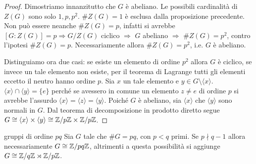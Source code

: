 \begin{proof}
    Dimostriamo innanzitutto che $G$ è abeliano. Le possibili cardinalità di $Z(G)$ sono solo $1, p, p^2$. $\#Z(G) = 1$ è esclusa dalla proposizione precedente. Non può essere neanche $\#Z(G) = p$, infatti si avrebbe $[G : Z(G)] = p \Rightarrow G/Z(G)$ ciclico $\Rightarrow$ $G$ abeliano $\Rightarrow$ $\#Z(G) = p^2$, contro l'ipotesi $\#Z(G) = p$. Necessariamente allora $\#Z(G) = p^2$, i.e. $G$ è abeliano.
    
    Distinguiamo ora due casi: se esiste un elemento di ordine $p^2$ allora $G$ è ciclico, se invece un tale elemento non esiste, per il teorema di Lagrange tutti gli elementi eccetto il neutro hanno ordine $p$. Sia $x$ un tale elemento e $y \in G \setminus \langle x \rangle$. $\langle x \rangle\cap \langle y \rangle = \{e\}$ perché se avessero in comune un elemento $z \neq e$ di ordine $p$ si avrebbe l'assurdo $\langle x \rangle = \langle z \rangle = \langle y \rangle$. Poiché $G$ è abeliano, sia $\langle x \rangle$ che $\langle y \rangle$ sono normali in $G$. Dal teorema di decomposizione in prodotto diretto segue $G \cong \langle x \rangle \times \langle y \rangle \cong \mathbb{Z}/p\mathbb{Z} \times \mathbb{Z}/p\mathbb{Z}$.
\end{proof}
\begin{proposition}{gruppi di ordine $pq$}
    Sia $G$ tale che $\#G = pq$, con $p < q$ primi. Se $p \nmid q-1$ allora necessariamente $G \cong \mathbb{Z}/pq\mathbb{Z}$, altrimenti a questa possibilità si aggiunge $G \cong  \mathbb{Z}/q\mathbb{Z} \rtimes \mathbb{Z}/p\mathbb{Z}$.
\end{proposition}
